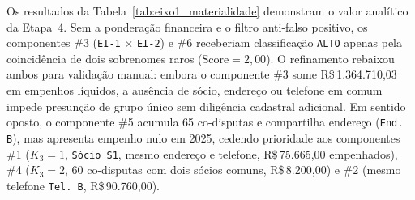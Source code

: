 \begin{table}[!t]
\centering
\caption{Priorização dos componentes do Eixo 1 após cruzamento de materialidade financeira e filtro onomástico.}
\label{tab:eixo1_materialidade}
\end{table}

Os resultados da Tabela~\ref{tab:eixo1_materialidade} demonstram o valor analítico da Etapa~4. Sem a ponderação financeira e o filtro anti-falso positivo, os componentes \#3 (\texttt{EI-1} $\times$ \texttt{EI-2}) e \#6 receberiam classificação \texttt{ALTO} apenas pela coincidência de dois sobrenomes raros ($\text{Score}=2{,}00$). O refinamento rebaixou ambos para validação manual: embora o componente \#3 some R\$\,1.364.710,03 em empenhos líquidos, a ausência de sócio, endereço ou telefone em comum impede presunção de grupo único sem diligência cadastral adicional. Em sentido oposto, o componente \#5 acumula 65 co-disputas e compartilha endereço (\texttt{End. B}), mas apresenta empenho nulo em 2025, cedendo prioridade aos componentes \#1 ($K_3=1$, \texttt{Sócio S1}, mesmo endereço e telefone, R\$\,75.665,00 empenhados), \#4 ($K_3=2$, 60 co-disputas com dois sócios comuns, R\$\,8.200,00) e \#2 (mesmo telefone \texttt{Tel. B}, R\$\,90.760,00).

